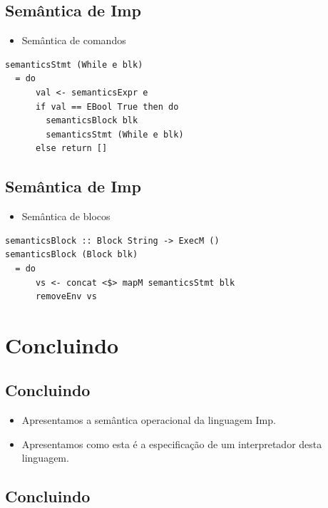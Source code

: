 \documentclass[11pt]{article}
\begin{document}
\subsection*{Semântica de Imp}
\label{sec:orgb51369b}

\begin{itemize}
\item Semântica de comandos
\end{itemize}

\begin{verbatim}
semanticsStmt (While e blk)
  = do
      val <- semanticsExpr e
      if val == EBool True then do
        semanticsBlock blk
        semanticsStmt (While e blk)
      else return []
\end{verbatim}
\subsection*{Semântica de Imp}
\label{sec:orgb5a4dfe}

\begin{itemize}
\item Semântica de blocos
\end{itemize}

\begin{verbatim}
semanticsBlock :: Block String -> ExecM ()
semanticsBlock (Block blk)
  = do
      vs <- concat <$> mapM semanticsStmt blk
      removeEnv vs
\end{verbatim}
\section*{Concluindo}
\label{sec:orgc859b39}

\subsection*{Concluindo}
\label{sec:org5ff71b2}

\begin{itemize}
\item Apresentamos a semântica operacional da linguagem Imp.

\item Apresentamos como esta é a especificação de um interpretador desta linguagem.
\end{itemize}
\subsection*{Concluindo}
\label{sec:org805418b}
\end{document}

